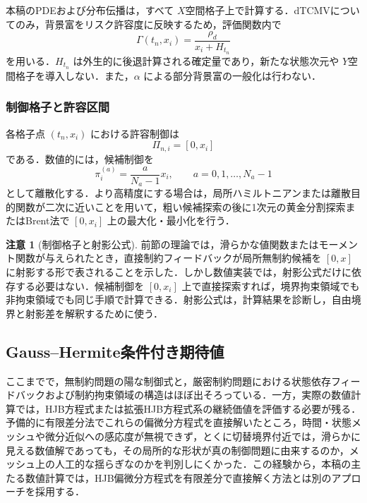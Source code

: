 \documentclass[10pt,a4paper]{article}
\theoremstyle{plain}
\theoremstyle{definition}
\newtheorem{remark}{注意}
\begin{document}
本稿のPDEおよび分布伝播は，すべて $X$空間格子上で計算する．dTCMVについてのみ，背景富をリスク許容度に反映するため，評価関数内で
\begin{equation}
  \Gamma(t_n,x_i)=\frac{\rho_d}{x_i+H_{t_n}}
  \label{eq:gamma-grid}
\end{equation}
を用いる．$H_{t_n}$ は外生的に後退計算される確定量であり，新たな状態次元や $Y$空間格子を導入しない．また，$\alpha$ による部分背景富の一般化は行わない．

\subsubsection{制御格子と許容区間}

各格子点 $(t_n,x_i)$ における許容制御は
\begin{equation}
  \Pi_{n,i}=[0,x_i]
  \label{eq:control-interval}
\end{equation}
である．数値的には，候補制御を
\begin{equation}
  \pi_i^{(a)}=\frac{a}{N_a-1}x_i,
  \qquad a=0,1,\ldots,N_a-1
  \label{eq:control-grid}
\end{equation}
として離散化する．より高精度にする場合は，局所ハミルトニアンまたは離散目的関数が二次に近いことを用いて，粗い候補探索の後に1次元の黄金分割探索またはBrent法で $[0,x_i]$ 上の最大化・最小化を行う．

\begin{remark}[制御格子と射影公式]
前節の理論では，滑らかな値関数またはモーメント関数が与えられたとき，直接制約フィードバックが局所無制約候補を $[0,x]$ に射影する形で表されることを示した．しかし数値実装では，射影公式だけに依存する必要はない．候補制御を $[0,x_i]$ 上で直接探索すれば，境界拘束領域でも非拘束領域でも同じ手順で計算できる．射影公式は，計算結果を診断し，自由境界と射影差を解釈するために使う．
\end{remark}

\subsection{Gauss--Hermite条件付き期待値}
\label{sec:gh}

ここまでで，無制約問題の陽な制御式と，厳密制約問題における状態依存フィードバックおよび制約拘束領域の構造はほぼ出そろっている．一方，実際の数値計算では，HJB方程式または拡張HJB方程式系の継続価値を評価する必要が残る．予備的に有限差分法でこれらの偏微分方程式を直接解いたところ，時間・状態メッシュや微分近似への感応度が無視できず，とくに切替境界付近では，滑らかに見える数値解であっても，その局所的な形状が真の制御問題に由来するのか，メッシュ上の人工的な揺らぎなのかを判別しにくかった．この経験から，本稿の主たる数値計算では，HJB偏微分方程式を有限差分で直接解く方法とは別のアプローチを採用する．
\end{document}
